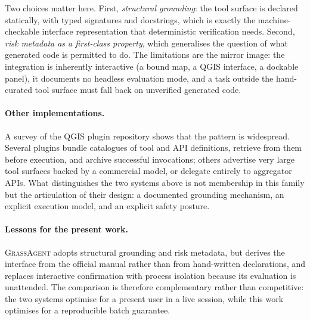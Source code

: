 Two choices matter here. First, \emph{structural grounding}: the tool surface is
declared statically, with typed signatures and docstrings, which is exactly the
machine-checkable interface representation that deterministic verification
needs. Second, \emph{risk metadata as a first-class property}, which generalises
the question of what generated code is permitted to do. The limitations are the
mirror image: the integration is inherently interactive (a bound map, a QGIS
interface, a dockable panel), it documents no headless evaluation mode, and a
task outside the hand-curated tool surface must fall back on unverified
generated code.

\paragraph{Other implementations.} A survey of the QGIS plugin repository shows
that the pattern is widespread. Several plugins bundle catalogues of tool and
API definitions, retrieve from them before execution, and archive successful
invocations; others advertise very large tool surfaces backed by a commercial
model, or delegate entirely to aggregator APIs. What distinguishes the two
systems above is not membership in this family but the articulation of their
design: a documented grounding mechanism, an explicit execution model, and an
explicit safety posture.

\paragraph{Lessons for the present work.} \textsc{GrassAgent} adopts structural
grounding and risk metadata, but derives the interface from the official manual
rather than from hand-written declarations, and replaces interactive
confirmation with process isolation because its evaluation is unattended. The
comparison is therefore complementary rather than competitive: the two systems
optimise for a present user in a live session, while this work optimises for a
reproducible batch guarantee.
